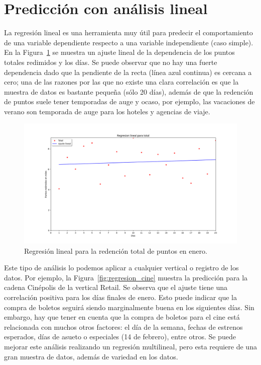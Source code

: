 \documentclass[a4,notitlepage,12pt,spanish]{jedm}
\begin{document}
\section{Predicci\'on con an\'alisis lineal} \label{sec:lineal}

La regresi\'on lineal es una herramienta muy \'util para predecir el comportamiento de una variable dependiente respecto a una variable independiente (caso simple). En la Figura~\ref{fig:regresion} se muestra un ajuste lineal de la dependencia de los puntos totales redimidos y los d\'ias. Se puede observar que no hay una fuerte dependencia dado que la pendiente de la recta (l\'inea azul continua) es cercana a cero; una de las razones por las que no existe una clara correlaci\'on es que la muestra de datos es bastante peque\~na (s\'olo 20 d\'ias), adem\'as de que la redenci\'on de puntos suele tener temporadas de auge y ocaso, por ejemplo, las vacaciones de verano son temporada de auge para los hoteles y agencias de viaje. 

\begin{figure}[!htb]
\centering
\includegraphics[scale=0.4]{regresion}
\caption{Regresi\'on lineal para la redenci\'on total de puntos en enero.}
\label{fig:regresion}
\end{figure}

Este tipo de an\'alisis lo podemos aplicar a cualquier vertical o registro de los datos. Por ejemplo, la Figura~\ref{fig:regresion_cine} muestra la predicci\'on para la cadena Cin\'epolis de la vertical Retail. Se observa que el ajuste tiene una correlaci\'on positiva para los d\'ias finales de enero. Esto puede indicar que la compra de boletos seguir\'a siendo marginalmente buena en los siguientes d\'ias. Sin embargo, hay que tener en cuenta que la compra de boletos para el cine est\'a relacionada con muchos otros factores: el d\'ia de la semana, fechas de estrenos esperados, d\'ias de asueto o especiales (14 de febrero), entre otros. Se puede mejorar este an\'alisis realizando un regresi\'on multilineal, pero esta requiere de una gran muestra de datos, adem\'as de variedad en los datos.
\end{document}

